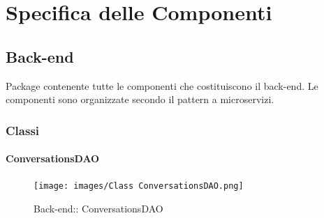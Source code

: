 \section{Specifica delle Componenti}
\subsection{Back-end}
Package contenente tutte le componenti che costituiscono il back-end. Le componenti sono organizzate secondo il pattern a microservizi.
\subsubsection{Classi}
\hypertarget{ ConversationsDAO_label}{\paragraph{ ConversationsDAO}}
\begin{figure}[h]
	\centering
	\texttt{[image: images/Class ConversationsDAO.png]}
	\caption{Back-end:: ConversationsDAO}
\end{figure}
